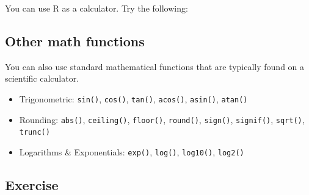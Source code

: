 \documentclass[letterpaperpaper,9pt,twocolumn,twoside,printwatermark=false]{pinp}
\providecommand{\tightlist}{%
  \setlength{\itemsep}{0pt}\setlength{\parskip}{0pt}}
\begin{document}
You can use R as a calculator. Try the following:

\begin{Shaded}
\begin{Highlighting}[]
 \OperatorTok{+}\StringTok{ }           
\NormalTok{(}\OperatorTok{*}\NormalTok{)}\OperatorTok{/} \OperatorTok{-}\StringTok{ }     
\OperatorTok{^} 
\end{Highlighting}
\end{Shaded}

\hypertarget{other-math-functions}{%
\subsection{Other math functions}\label{other-math-functions}}

You can also use standard mathematical functions that are typically
found on a scientific calculator.

\begin{itemize}
\tightlist
\item
  Trigonometric: \texttt{sin()}, \texttt{cos()}, \texttt{tan()},
  \texttt{acos()}, \texttt{asin()}, \texttt{atan()}
\item
  Rounding: \texttt{abs()}, \texttt{ceiling()}, \texttt{floor()},
  \texttt{round()}, \texttt{sign()}, \texttt{signif()}, \texttt{sqrt()},
  \texttt{trunc()}
\item
  Logarithms \& Exponentials: \texttt{exp()}, \texttt{log()},
  \texttt{log10()}, \texttt{log2()}
\end{itemize}

\begin{Shaded}
\begin{Highlighting}[]
\NormalTok{(}\NormalTok{)          }
\NormalTok{(}\NormalTok{)}
\NormalTok{(}\NormalTok{, }\NormalTok{)}
\end{Highlighting}
\end{Shaded}

\hypertarget{exercise-1}{%
\subsection{Exercise}\label{exercise-1}}
\end{document}
